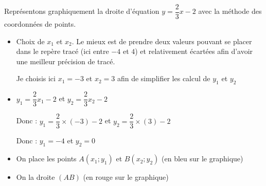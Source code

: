 \begin{ex}{}{}
\begin{minipage}{10.5cm}
Représentons graphiquement la droite d'équation $y=\dfrac{2}{3}x-2$ avec la méthode des coordonnées de points.

\begin{itemize}
\item Choix de $x_{1}$ et $x_{2}$. Le mieux est de prendre deux valeurs pouvant se placer dans le repère tracé (ici entre $-4$ et $4$) et relativement écartées afin d'avoir une meilleur précision de tracé.

Je choisis ici $x_1=-3$ et $x_2=3$ afin de simplifier les calcul de $y_{1}$ et $y_{2}$
\item $y_{1} = \dfrac{2}{3}x_{1}-2$ et $y_{2} = \dfrac{2}{3}x_{2}-2$

Donc : $y_{1} = \dfrac{2}{3}\times (-3)-2$ et $y_{2} = \dfrac{2}{3}\times (3)-2$

Donc : $y_{1} = -4$ et $y_{2} = 0$
\item On place les points $A(x_1;y_1 )$ et $B(x_2;y_2)$ (en bleu sur le graphique)
\item On la droite $(AB)$ (en rouge sur le graphique)
\end{itemize}
\end{minipage}
\hspace{5mm}
\begin{minipage}{5.5cm}
\begin{center}
\end{center}
\end{minipage}
\end{ex}
